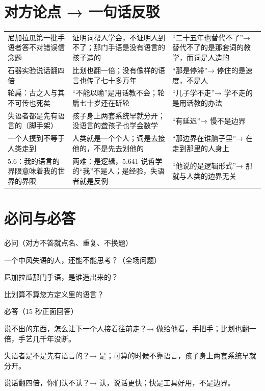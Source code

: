 \documentclass[quick,con]{debate}
\begin{document}
\section{对方论点 → 一句话反驳}
\begin{tabularx}{\linewidth}{@{}Y Y Y@{}}\toprule
{}&&\\\midrule
尼加拉瓜第一批手语者答不对错误信念题&证明词帮人学会，不证明人到不了；那门手语是没有语言的孩子造的&“二十五年也替代不了”→ 替代不了的是那套词的教学，而词是人造的\\
石器实验说话翻四倍&比划也翻一倍；没有像样的语言也传了七十多万年&“那是停滞”→ 停住的是速度，不是人\\
轮扁：古之人与其不可传也死矣&“不能以喻”是用话教不会；轮扁七十岁还在斫轮&“儿子学不走”→ 学不走的是用话教的办法\\
失语者都是先有语言的（脚手架）&孩子身上两套系统早就分开；没语言的聋孩子也学会数学&“有延迟”→ 慢不是边界\\
一个人摸到不等于人类走到&人类就是一个个人；词是去接他的，不是先去划他的&“那边界在谁脑子里”→ 在走到那里的人身上\\
5.6：我的语言的界限意味着我的世界的界限&两难：是逻辑，5.641 说哲学的“我”不是人；是经验，失语者就是反例&“他说的是逻辑形式”→ 那就与人类的边界无关\\
\bottomrule\end{tabularx}

\section{必问与必答}
\begin{points}{必问（对方不答就点名、重复、不换题）}
\item 一个中风失语的人，还能不能思考？（全场问题）
\item 尼加拉瓜那门手语，是谁造出来的？
\item 比划算不算您方定义里的语言？
\end{points}
\begin{points}{必答（15 秒正面回答）}
\item 说不出的东西，怎么让下一个人接着往前走？→ 做给他看，手把手；比划也翻一倍，手艺几千年没断。
\item 失语者是不是先有语言的？→ 是；可算的时候不靠语言，孩子身上两套系统早就分开。
\item 说话翻四倍，你们认不认？→ 认，说话更快；快是工具好用，不是边界。
\end{points}
\end{document}
